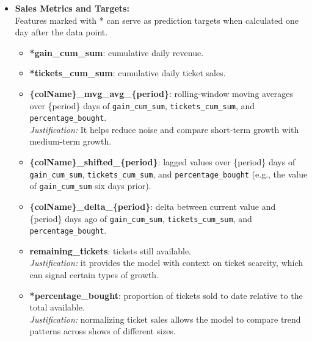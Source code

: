 \documentclass{Configuration_Files/PoliMi3i_thesis}
\begin{document}
\begin{itemize}
	\item \textbf{Sales Metrics and Targets:}\\
	      Features marked with * can serve as prediction targets when calculated one day after the data point.
	      \begin{itemize}
		      \item \textbf{*gain\_cum\_sum}: cumulative daily revenue.
		      \item \textbf{*tickets\_cum\_sum}: cumulative daily ticket sales.
		      \item \textbf{\{colName\}\_mvg\_avg\_\{period\}}: rolling-window moving averages over \{period\} days of \texttt{gain\_cum\_sum}, \texttt{tickets\_cum\_sum}, and \texttt{percentage\_bought}.  \\
		            \emph{Justification:} It helps reduce noise and compare short-term growth with medium-term growth.
		      \item \textbf{\{colName\}\_shifted\_\{period\}}: lagged values over \{period\} days of \texttt{gain\_cum\_sum}, \texttt{tickets\_cum\_sum}, and \texttt{percentage\_bought} (e.g., the value of \texttt{gain\_cum\_sum} six days prior).  \\
          \item \textbf{\{colName\}\_delta\_\{period\}}: delta between current value and \{period\} days ago of \texttt{gain\_cum\_sum}, \texttt{tickets\_cum\_sum}, and \texttt{percentage\_bought}.  \\

		      \item \textbf{remaining\_tickets}: tickets still available.  \\
		            \emph{Justification:} it provides the model with context on ticket scarcity, which can signal certain types of growth.
		      \item \textbf{*percentage\_bought}: proportion of tickets sold to date relative to the total available.  \\
		            \emph{Justification:} normalizing ticket sales allows the model to compare trend patterns across shows of different sizes.
	      \end{itemize}


\end{itemize}
\end{document}
